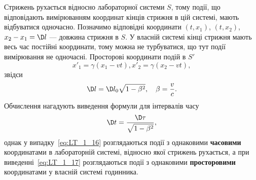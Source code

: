 Стрижень рухається відносно лабораторної системи $S$, тому події, що відповідають вимірюванням координат кінців стрижня
в цій системі, мають відбуватися одночасно. Позначимо відповідні координати $(t,x_1)$, $(t,x_2)$, $x_2-x_1=\D l$ ---
довжина стрижня в $S$. У власній системі кінці стрижня мають весь час постійні координати, тому можна не турбуватися, що
тут події вимірювання не одночасні. Просторові координати подій в $S'$
\begin{equation*}
   x'_1=\gamma (x_1-vt), x'_2=\gamma (x_2-vt),
\end{equation*}
%
звідси
\begin{equation} \label{eq:LT_1_16}
	\D l=\D l_0\sqrt{1-\beta^2},\quad \beta = \frac{v}{c}.
\end{equation}
Обчислення нагадують виведення формули для інтервалів часу
\begin{equation}\label{eq:LT_1_17}
	\D t=\frac{\D \tau }{\sqrt{1-\beta^2}},
\end{equation}
%
однак у випадку~\eqref{eq:LT_1_16} розглядаються події з однаковими \textbf{часовими} координатами в лабораторній
системі, відносно якої стрижень рухається, а при виведенні~\eqref{eq:LT_1_17} розглядаються події з однаковими
\textbf{просторовими} координатами у власній системі годинника.

